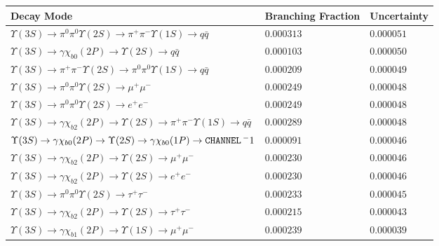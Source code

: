 \documentclass[12pt]{article}
\begin{document}
\newpage
\hspace{-1.3in} \vspace{-1.4in}
\begin{tabular}{p{4.7in} l l}
Decay Mode & Branching Fraction & Uncertainty \\ \hline
$   \Upsilon(3S) \to \pi^0 \pi^0 \Upsilon(2S) \to \pi^+ \pi^- \Upsilon(1S) \to q\bar{q}                                  $ & $   0.000313    $ & $   0.000051   $ \\ 
$   \Upsilon(3S) \to \gamma \chi_{b0}(2P) \to \Upsilon(2S) \to q\bar{q}                                                  $ & $   0.000103    $ & $   0.000050    $ \\ 
$   \Upsilon(3S) \to \pi^+ \pi^- \Upsilon(2S) \to \pi^0 \pi^0 \Upsilon(1S) \to q\bar{q}                                  $ & $   0.000209    $ & $   0.000049     $ \\ 
$   \Upsilon(3S) \to \pi^0 \pi^0 \Upsilon(2S) \to \mu^+ \mu^-                                                            $ & $   0.000249     $ & $   0.000048    $ \\ 
$   \Upsilon(3S) \to \pi^0 \pi^0 \Upsilon(2S) \to e^+ e^-                                                                $ & $   0.000249     $ & $   0.000048    $ \\ 
$   \Upsilon(3S) \to \gamma \chi_{b2}(2P) \to \Upsilon(2S) \to \pi^+ \pi^- \Upsilon(1S) \to q\bar{q}                     $ & $   0.000289     $ & $   0.000048    $ \\ 
$   \Upsilon(3S) \to \gamma \chi_{b0}(2P) \to \Upsilon(2S) \to \gamma \chi_{b0}(1P) \to {\tt \small CHANNEL} \, ^-1                 $ & $   0.000091             $ & $   0.000046    $ \\ 
$   \Upsilon(3S) \to \gamma \chi_{b2}(2P) \to \Upsilon(2S) \to \mu^+ \mu^-                                               $ & $   0.000230    $ & $   0.000046    $ \\ 
$   \Upsilon(3S) \to \gamma \chi_{b2}(2P) \to \Upsilon(2S) \to e^+ e^-                                                   $ & $   0.000230    $ & $   0.000046    $ \\ 
$   \Upsilon(3S) \to \pi^0 \pi^0 \Upsilon(2S) \to \tau^+ \tau^-                                                          $ & $   0.000233    $ & $   0.000045    $ \\ 
$   \Upsilon(3S) \to \gamma \chi_{b2}(2P) \to \Upsilon(2S) \to \tau^+ \tau^-                                             $ & $   0.000215    $ & $   0.000043     $ \\ 
$   \Upsilon(3S) \to \gamma \chi_{b1}(2P) \to \Upsilon(1S) \to \mu^+ \mu^-                                               $ & $   0.000239    $ & $   0.000039   $ \\ 

\end{tabular}
\end{document}
